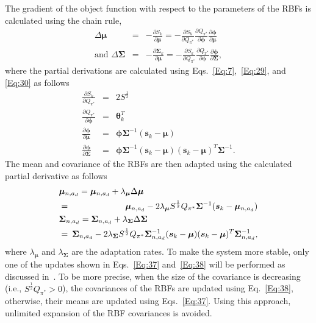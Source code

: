 \documentclass{ieeeaccess}
\def\k{_{k}}
\def\bt{\bm{\theta}}
\def\u{\bm{\mu}}
\def\Sig{\bm{\Sigma}}
\def\s{\bm{s}}
\def\S{S}
\begin{document}
%
The gradient of the object function with respect to the parameters of the RBFs is calculated using the chain rule,
%
\begin{eqnarray}
\Delta\u &=& -\frac{\partial\S\k}{\partial\u} =  -\frac{\partial\S\k}{\partial Q_{\pi^*}}\frac{\partial Q_{\pi^*}}{\partial \bm{\phi}}\frac{\partial \bm{\phi}}{\partial\u}\\
\text{and }\Delta\Sig &=& -\frac{\partial\Sig\k}{\partial\u} =  -\frac{\partial\S\k}{\partial Q_{\pi^*}}\frac{\partial Q_{\pi^*}}{\partial\bm{\phi}}\frac{\partial\bm{\phi}}{\partial\Sig},
\end{eqnarray}
%
where the partial derivations are calculated using Eqs.~\eqref{Eq:7},~\eqref{Eq:29}, and \eqref{Eq:30} as follows
%
\begin{eqnarray}
\frac{\partial\S\k}{\partial Q_{\pi^*}} &=& 2\S^{\frac{1}{2}} \label{Eq:34}\\
\frac{\partial Q_{\pi^*}}{\partial\bm{\phi}} &=& \bt^T\k\\
\frac{\partial\bm{\phi}}{\partial\u} &=& \bm{\phi}\Sig^{-1} (\s\k -\u)\\
\frac{\partial\bm{\phi}}{\partial\Sig} &=& \bm{\phi}\Sig^{-1} (\s\k -\u) (\s\k -\u)^T\Sig^{-1}.
\end{eqnarray}
%
The mean and covariance of the RBFs are then adapted using the calculated partial derivative as follows
%
\begin{eqnarray}
\lefteqn{\u_{n,a_d} =  \u_{n,a_d} +\lambda_{\u}\Delta\u\nonumber}\\
&=\!\!\!& \u_{n,a_d} -2\lambda_{\u}\S^{\frac{1}{2}} Q_{\pi^*}\Sig^{-1}(\s\k- \u_{n,a_d})\label{Eq:37}\\
\lefteqn{\Sig_{n,a_d} =  \Sig_{n,a_d} +\lambda_{\Sig}\Delta\Sig\nonumber}\\
&=\!\!\!& \Sig_{n,a_d} -2\lambda_{\Sig}\S^{\frac{1}{2}} Q_{\pi^*}\Sig^{-1}_{n, a_d}(\s\k- \u)(\s\k- \u)^T\Sig_{n,a_d}^{-1},\nonumber\\\label{Eq:38}
\end{eqnarray}
%
where $\lambda_{\u}$ and $\lambda_{\Sig}$ are the adaptation rates. To make the system more stable, only one of the updates shown in Eqs.~\eqref{Eq:37} and~\eqref{Eq:38} will be performed as discussed in~\cite{18}. To be more precise, when the size of the covariance is decreasing (i.e., $\S^{\frac{1}{2}}Q_{\pi^*} > 0$), the covariances of the RBFs are updated using
Eq.~\eqref{Eq:38}, otherwise, their means are updated using Eqs.~\eqref{Eq:37}. Using this approach, unlimited expansion of the RBF covariances is avoided.
\end{document}
